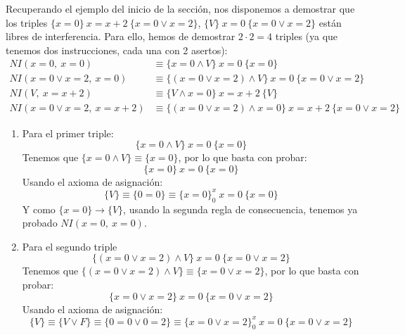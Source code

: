 \begin{ejemplo}
    Recuperando el ejemplo del inicio de la sección, nos disponemos a demostrar que los triples $\{x=0\}\ x=x+2\ \{x=0 \lor x=2\}$, $\{V\}\ x=0\ \{x=0 \lor x=2\}$ están libres de interferencia. Para ello, hemos de demostrar $2\cdot 2=4$ triples (ya que tenemos dos instrucciones, cada una con 2 asertos):
    \begin{align*}
        NI(x=0,\ x=0) &\equiv \{x=0 \land V\}\ x=0\ \{x=0\} \\
        NI(x=0 \lor x=2,\ x=0) &\equiv \{(x=0 \lor x=2) \land V\}\ x=0\ \{x=0 \lor x=2\} \\
        NI(V,\ x=x+2) &\equiv \{V \land x=0\}\ x=x+2\ \{V\} \\
        NI(x=0 \lor x=2,\ x=x+2) &\equiv \{(x=0 \lor x=2) \land x=0\}\ x=x+2\ \{x=0 \lor x=2\}
    \end{align*}
    \begin{enumerate}
        \item Para el primer triple:
            \begin{equation*}
                \{x=0 \land V\}\ x=0\ \{x=0\}
            \end{equation*}
            Tenemos que $\{x=0 \land V\}\equiv \{x=0\}$, por lo que basta con probar:
            \begin{equation*}
                \{x=0\}\ x=0\ \{x=0\}
            \end{equation*}
            Usando el axioma de asignación:
            \begin{equation*}
                \{V\} \equiv \{0=0\} \equiv \{x=0\}^x_0\ x=0\ \{x=0\}
            \end{equation*}
            Y como $\{x=0\}\rightarrow\{V\}$, usando la segunda regla de consecuencia, tenemos ya probado $NI(x=0,\ x=0)$.
        \item Para el segundo triple
            \begin{equation*}
                \{(x=0 \lor x=2) \land V\}\ x=0\ \{x=0 \lor x=2\}
            \end{equation*}
            Tenemos que $\{(x=0 \lor x=2) \land V\}\equiv \{x= 0 \lor x=2\}$, por lo que basta con probar:
            \begin{equation*}
                \{x=0 \lor x=2\}\ x=0\ \{x=0 \lor x=2\}
            \end{equation*}
            Usando el axioma de asignación:
            \begin{equation*}
                \{V\} \equiv \{V \lor F\} \equiv \{0=0 \lor 0=2\} \equiv \{x=0 \lor x=2\}^x_0\ x=0\ \{x=0 \lor x=2\}

\end{equation*}
\end{enumerate}
\end{ejemplo}
